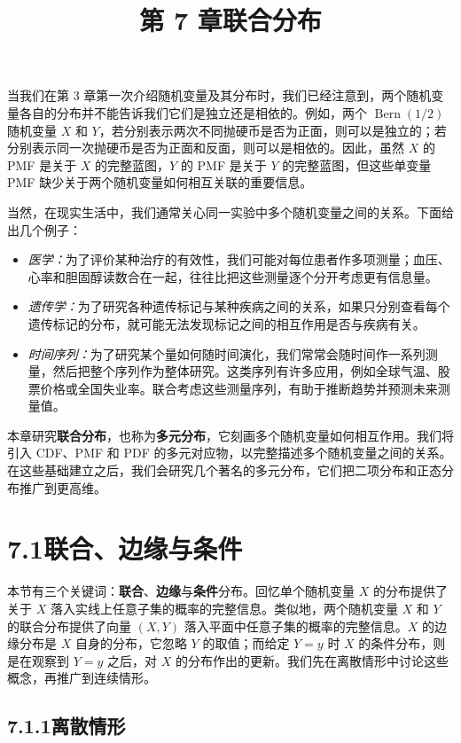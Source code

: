\documentclass[UTF8,12pt,a4paper,fontset=fandol]{ctexart}
\title{第 7 章\quad 联合分布}
\author{}
\date{}
\begin{document}
\maketitle

当我们在第 3 章第一次介绍随机变量及其分布时，我们已经注意到，两个随机变量各自的分布并不能告诉我们它们是独立还是相依的。例如，两个 $\operatorname{Bern}(1/2)$ 随机变量 $X$ 和 $Y$，若分别表示两次不同抛硬币是否为正面，则可以是独立的；若分别表示同一次抛硬币是否为正面和反面，则可以是相依的。因此，虽然 $X$ 的 PMF 是关于 $X$ 的完整蓝图，$Y$ 的 PMF 是关于 $Y$ 的完整蓝图，但这些单变量 PMF 缺少关于两个随机变量如何相互关联的重要信息。

当然，在现实生活中，我们通常关心同一实验中多个随机变量之间的关系。下面给出几个例子：
\begin{itemize}
  \item \textit{医学：}为了评价某种治疗的有效性，我们可能对每位患者作多项测量；血压、心率和胆固醇读数合在一起，往往比把这些测量逐个分开考虑更有信息量。
  \item \textit{遗传学：}为了研究各种遗传标记与某种疾病之间的关系，如果只分别查看每个遗传标记的分布，就可能无法发现标记之间的相互作用是否与疾病有关。
  \item \textit{时间序列：}为了研究某个量如何随时间演化，我们常常会随时间作一系列测量，然后把整个序列作为整体研究。这类序列有许多应用，例如全球气温、股票价格或全国失业率。联合考虑这些测量序列，有助于推断趋势并预测未来测量值。
\end{itemize}

本章研究\textbf{联合分布}，也称为\textbf{多元分布}，它刻画多个随机变量如何相互作用。我们将引入 CDF、PMF 和 PDF 的多元对应物，以完整描述多个随机变量之间的关系。在这些基础建立之后，我们会研究几个著名的多元分布，它们把二项分布和正态分布推广到更高维。

\section*{7.1\quad 联合、边缘与条件}

本节有三个关键词：\textbf{联合}、\textbf{边缘}与\textbf{条件}分布。回忆单个随机变量 $X$ 的分布提供了关于 $X$ 落入实线上任意子集的概率的完整信息。类似地，两个随机变量 $X$ 和 $Y$ 的联合分布提供了向量 $(X,Y)$ 落入平面中任意子集的概率的完整信息。$X$ 的边缘分布是 $X$ 自身的分布，它忽略 $Y$ 的取值；而给定 $Y=y$ 时 $X$ 的条件分布，则是在观察到 $Y=y$ 之后，对 $X$ 的分布作出的更新。我们先在离散情形中讨论这些概念，再推广到连续情形。

\subsection*{7.1.1\quad 离散情形}
\end{document}
